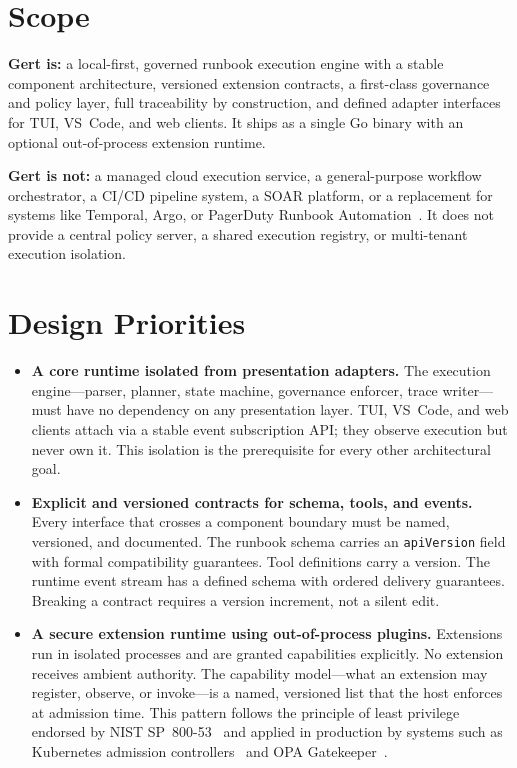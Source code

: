 \section{Scope}

\textbf{Gert is:} a local-first, governed runbook execution engine with a stable component
architecture, versioned extension contracts, a first-class governance and policy layer, full traceability
by construction, and defined adapter interfaces for TUI, VS~Code, and web clients. It ships as a single
Go binary with an optional out-of-process extension runtime.

\textbf{Gert is not:} a managed cloud execution service, a general-purpose workflow orchestrator, a
CI/CD pipeline system, a SOAR platform, or a replacement for systems like Temporal, Argo, or PagerDuty
Runbook Automation~\cite{temporal-docs,argo-workflows,pagerduty-automation}. It does not provide a central policy server, a shared execution registry, or
multi-tenant execution isolation.

\section{Design Priorities}

\begin{itemize}
  \item \textbf{A core runtime isolated from presentation adapters.} The execution engine---parser,
    planner, state machine, governance enforcer, trace writer---must have no dependency on any
    presentation layer. TUI, VS~Code, and web clients attach via a stable event subscription API;
    they observe execution but never own it. This isolation is the prerequisite for every other
    architectural goal.

  \item \textbf{Explicit and versioned contracts for schema, tools, and events.} Every interface that
    crosses a component boundary must be named, versioned, and documented. The runbook schema carries
    an \texttt{apiVersion} field with formal compatibility guarantees. Tool definitions carry a version.
    The runtime event stream has a defined schema with ordered delivery guarantees. Breaking a contract
    requires a version increment, not a silent edit.

  \item \textbf{A secure extension runtime using out-of-process plugins.} Extensions run in isolated
    processes and are granted capabilities explicitly. No extension receives ambient authority. The
    capability model---what an extension may register, observe, or invoke---is a named, versioned list
    that the host enforces at admission time. This pattern follows the principle of least privilege
    endorsed by NIST SP~800-53~\cite{nist-sp800-53} and applied in production by systems such as Kubernetes admission
    controllers~\cite{kubernetes-docs} and OPA Gatekeeper~\cite{opa-gatekeeper}.
\end{itemize}

